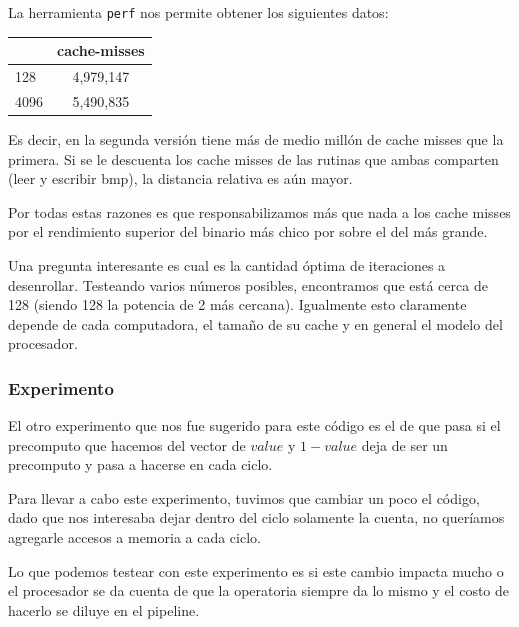 La herramienta \texttt{perf} nos permite obtener los siguientes datos:

\begin{tabular}{ | l | c |  }
  \hline
  
  & cache-misses \\ \hline
  128 & 4,979,147\\ \hline
  4096 & 5,490,835\\ \hline
\end{tabular}

Es decir, en la segunda versión tiene más de medio millón de cache misses que la primera. Si se le descuenta los cache misses de las rutinas que ambas comparten (leer y escribir bmp), la distancia relativa es aún mayor.

Por todas estas razones es que responsabilizamos más que nada a los cache misses por el rendimiento superior del binario más chico por sobre el del más grande.

Una pregunta interesante es cual es la cantidad óptima de iteraciones a desenrollar. Testeando varios números posibles, encontramos que está cerca de 128 (siendo 128 la potencia de 2 más cercana). Igualmente esto claramente depende de cada computadora, el tamaño de su cache y en general el modelo del procesador.


\subsubsection*{Experimento}
El otro experimento que nos fue sugerido para este código es el de que pasa si el precomputo que hacemos del vector de $value$ y $1-value$ deja de ser un precomputo y pasa a hacerse en cada ciclo.


Para llevar a cabo este experimento, tuvimos que cambiar un poco el código, dado que nos interesaba dejar dentro del ciclo solamente la cuenta, no queríamos agregarle accesos a memoria a cada ciclo.

Lo que podemos testear con este experimento es si este cambio impacta mucho o el procesador se da cuenta de que la operatoria siempre da lo mismo y el costo de hacerlo se diluye en el pipeline.

